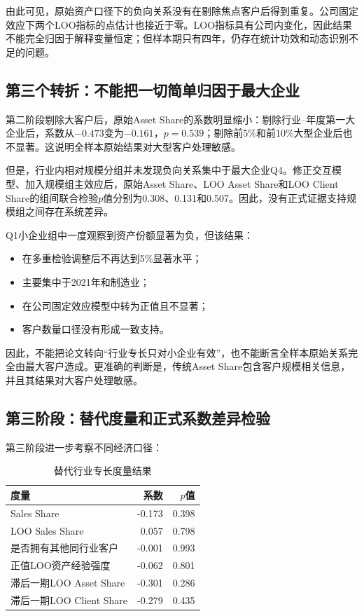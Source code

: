 \documentclass[12pt,a4paper]{article}
\begin{document}
由此可见，原始资产口径下的负向关系没有在剔除焦点客户后得到重复。公司固定效应下两个LOO指标的点估计也接近于零。LOO指标具有公司内变化，因此结果不能完全归因于解释变量恒定；但样本期只有四年，仍存在统计功效和动态识别不足的问题。

\subsection{第三个转折：不能把一切简单归因于最大企业}

第二阶段剔除大客户后，原始Asset Share的系数明显缩小：剔除行业--年度第一大企业后，系数从$-0.473$变为$-0.161$，$p=0.539$；剔除前5\%和前10\%大型企业后也不显著。这说明全样本原始结果对大型客户处理敏感。

但是，行业内相对规模分组并未发现负向关系集中于最大企业Q4。修正交互模型、加入规模组主效应后，原始Asset Share、LOO Asset Share和LOO Client Share的组间联合检验$p$值分别为0.308、0.131和0.507。因此，没有正式证据支持规模组之间存在系统差异。

Q1小企业组中一度观察到资产份额显著为负，但该结果：

\begin{itemize}
  \item 在多重检验调整后不再达到5\%显著水平；
  \item 主要集中于2021年和制造业；
  \item 在公司固定效应模型中转为正值且不显著；
  \item 客户数量口径没有形成一致支持。
\end{itemize}

因此，不能把论文转向“行业专长只对小企业有效”，也不能断言全样本原始关系完全由最大客户造成。更准确的判断是，传统Asset Share包含客户规模相关信息，并且其结果对大客户处理敏感。

\subsection{第三阶段：替代度量和正式系数差异检验}

第三阶段进一步考察不同经济口径：

\begin{table}[htbp]
\centering
\caption{替代行业专长度量结果}
\begin{tabular}{lrr}
\toprule
度量 & 系数 & $p$值 \\
\midrule
Sales Share & -0.173 & 0.398 \\
LOO Sales Share & 0.057 & 0.798 \\
是否拥有其他同行业客户 & -0.001 & 0.993 \\
正值LOO资产经验强度 & -0.062 & 0.801 \\
滞后一期LOO Asset Share & -0.301 & 0.286 \\
滞后一期LOO Client Share & -0.279 & 0.435 \\
\bottomrule
\end{tabular}
\end{table}
\end{document}
